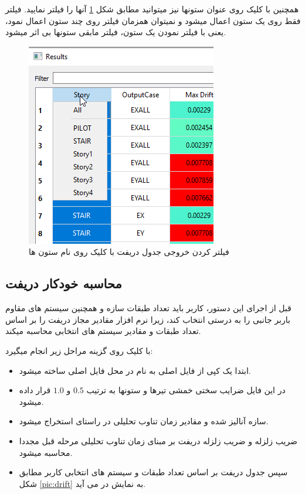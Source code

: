 همچنین با کلیک روی عنوان ستونها نیز میتوانید مطابق شکل 
\ref{pic:drift_filter}
 آنها را فیلتر نمایید. فیلتر فقط روی یک ستون اعمال میشود و نمیتوان همزمان فیلتر روی چند ستون اعمال نمود، یعنی با فیلتر نمودن یک ستون، فیلتر مابقی ستونها بی اثر میشود.
 
 
\begin{figure}[H]
    \centering
    \includegraphics[scale=0.7]{figures/drift_filter}
    \caption{فیلتر کردن خروجی جدول دریفت با کلیک روی نام ستون ها}
    \label{pic:drift_filter}
\end{figure}


\subsection{محاسبه خودکار دریفت}
قبل از اجرای این دستور، کاربر باید تعداد طبقات سازه و همچنین سیستم های مقاوم باربر جانبی را به درستی انتخاب کند، زیرا نرم افزار مقادیر مجاز دریفت را بر اساس تعداد طبقات و مقادیر 
سیستم های انتخابی محاسبه میکند.

با کلیک روی گزینه 
مراحل زیر انجام میگیرد:
\begin{itemize}
    \item ابتدا یک کپی از فایل اصلی به نام  در محل فایل اصلی ساخته میشود.
    \item در این فایل ضرایب سختی خمشی تیرها و ستونها به ترتیب $0.5$ و $1.0$ قرار داده میشود.
    \item سازه آنالیز شده و مقادیر زمان تناوب تحلیلی در راستای  استخراج میشود.
    \item ضریب زلزله و ضریب زلزله دریفت بر مبنای زمان تناوب تحلیلی مرحله قبل مجددا محاسبه میشود.
    \item سپس جدول دریفت بر اساس تعداد طبقات و سیستم های انتخابی کاربر مطابق شکل \ref{pic:drift} به نمایش در می آید.
\end{itemize}


